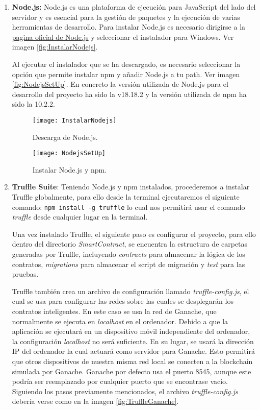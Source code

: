 \begin{enumerate}

\item \textbf{Node.js:} Node.js es una plataforma de ejecución para JavaScript del lado del servidor y es esencial para la gestión de paquetes y la ejecución de varias herramientas de desarrollo. 
Para instalar Node.js es necesario dirigirse a la \href{https://nodejs.org/en}{pagina oficial de Node.js} y seleccionar el instalador para Windows. Ver imagen \ref{fig:InstalarNodejs}.

Al ejecutar el instalador que se ha descargado, es necesario seleccionar la opción que permite instalar npm y añadir Node.js a tu path. Ver imagen \ref{fig:NodejsSetUp}.  
En concreto la versión utilizada de Node.js para el desarrollo del proyecto ha sido la v18.18.2 y la versión utilizada de npm ha sido la 10.2.2.

\begin{figure}[h]
	\label{img:InstalarNodejs}
	\centering
	\texttt{[image: InstalarNodejs]}
	\caption[Descarga de Node.js]{Descarga de Node.js.}
\end{figure}

\begin{figure}[h]
	\label{img:NodejsSetUp}
	\centering
	\texttt{[image: NodejsSetUp]}
	\caption[Instalar Node.js y npm]{Instalar Node.js y npm.}
\end{figure}

\item \textbf{Truffle Suite}: Teniendo Node.js y npm instalados, procederemos a instalar Truffle globalmente, para ello desde la terminal ejecutaremos el siguiente comando: \texttt{npm install -g truffle} lo cual nos permitirá usar el comando \textit{truffle} desde cualquier lugar en la terminal.

Una vez instalado Truffle, el siguiente paso es configurar el proyecto, para ello dentro del directorio \textit{SmartContract}, se encuentra la estructura de carpetas generadas por Truffle, incluyendo \textit{contracts} para almacenar la lógica de los contratos, \textit{migrations} para almacenar el script de migración y \textit{test} para las pruebas.

Truffle también crea un archivo de configuración llamado \textit{truffle-config.js}, el cual se usa para configurar las redes sobre las cuales se desplegarán los contratos inteligentes.
En este caso se usa la red de Ganache, que normalmente se ejecuta en \textit{localhost} en el ordenador. Debido a que la aplicación se ejecutará en un dispositivo móvil independiente del ordenador, la configuración \textit{localhost} no será suficiente. 
En su lugar, se usará la dirección IP del ordenador la cual actuará como servidor para Ganache. Esto permitirá que otros dispositivos de nuestra misma red local se conecten a la blockchain simulada por Ganache.
Ganache por defecto usa el puerto 8545, aunque este podría ser reemplazado por cualquier puerto que se encontrase vacío.
Siguiendo los pasos previamente mencionados, el archivo \textit{truffle-config.js} debería verse como en la imagen \ref{fig:TruffleGanache}.


\end{enumerate}

